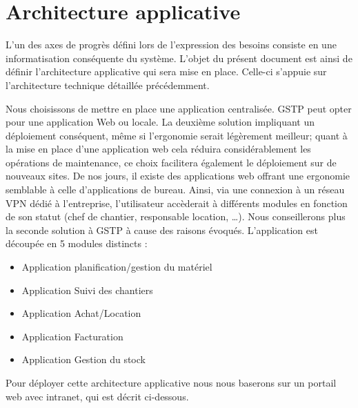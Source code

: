 \section{Architecture applicative}
        L’un des axes de progrès défini lors de l’expression des besoins consiste en une informatisation conséquente du système. L’objet du présent document est ainsi de définir l’architecture applicative qui sera mise en place. Celle-ci s’appuie sur l’architecture technique détaillée précédemment.

        Nous choisissons de mettre en place une application centralisée. GSTP peut opter pour une application Web ou locale. La deuxième solution impliquant un déploiement conséquent, même si l'ergonomie serait légèrement meilleur; quant à la mise en place d'une application web cela réduira considérablement les opérations de maintenance, ce choix facilitera également le déploiement sur de nouveaux sites. De nos jours, il existe des applications web offrant une ergonomie semblable à celle d'applications de bureau. Ainsi, via une connexion à un réseau VPN dédié à l’entreprise, l’utilisateur accèderait à différents modules en fonction de son statut (chef de chantier, responsable location, …). Nous conseillerons plus la seconde solution à GSTP à cause des raisons évoqués.
L’application est découpée en 5 modules distincts :
\begin{itemize}
	\item Application planification/gestion du matériel
	\item Application Suivi des chantiers
	\item Application Achat/Location
	\item Application Facturation
	\item Application Gestion du stock
\end{itemize}

Pour déployer cette architecture applicative nous nous baserons sur un portail web avec intranet, qui est décrit ci-dessous.

